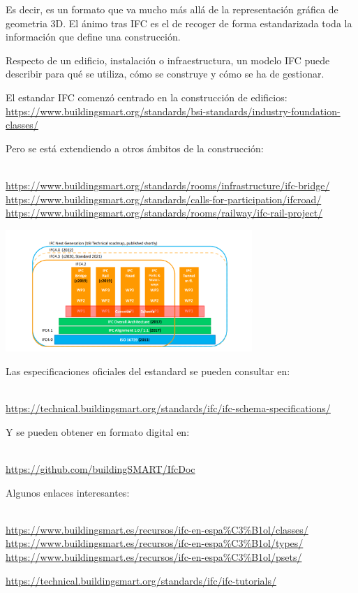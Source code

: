 \documentclass[spanish,12pt,a4paper,final,oneside]{book}
\begin{document}
Es decir, es un formato que va mucho más allá de la representación gráfica de geometria 3D. El ánimo tras IFC es el de recoger de forma estandarizada toda la información que define una construcción. 

Respecto de un edificio, instalación o infraestructura, un modelo IFC puede describir para qué se utiliza, cómo se construye y cómo se ha de gestionar.

El estandar IFC comenzó centrado en la construcción de edificios:
\\{\small  \url{https://www.buildingsmart.org/standards/bsi-standards/industry-foundation-classes/}}

Pero se está extendiendo a otros ámbitos de la construcción:
\begin{small}
\\ \url{https://www.buildingsmart.org/standards/rooms/infrastructure/ifc-bridge/}
\\ \url{https://www.buildingsmart.org/standards/calls-for-participation/ifcroad/}
\\ \url{https://www.buildingsmart.org/standards/rooms/railway/ifc-rail-project/}
\end{small}

\includegraphics[width=0.7\textwidth]{IFC schema extensions}


Las especificaciones oficiales del estandard se pueden consultar en:
\begin{small}
\\ \url{https://technical.buildingsmart.org/standards/ifc/ifc-schema-specifications/}
\end{small}
Y se pueden obtener en formato digital en:
\begin{small}
\\ \url{https://github.com/buildingSMART/IfcDoc}
\end{small}

Algunos enlaces interesantes:
\begin{small}
\\ \url{https://www.buildingsmart.es/recursos/ifc-en-espa%C3%B1ol/classes/}
\\ \url{https://www.buildingsmart.es/recursos/ifc-en-espa%C3%B1ol/types/}
\\ \url{https://www.buildingsmart.es/recursos/ifc-en-espa%C3%B1ol/psets/}

\url{https://technical.buildingsmart.org/standards/ifc/ifc-tutorials/}

\end{small}
\end{document}
